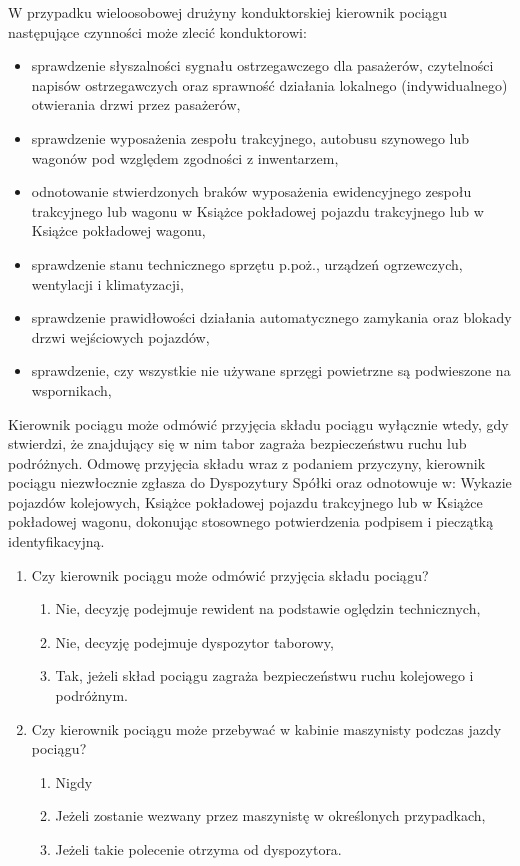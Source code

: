 W przypadku wieloosobowej drużyny konduktorskiej kierownik pociągu następujące czynności może zlecić konduktorowi:
\begin{itemize}
	\item sprawdzenie słyszalności sygnału ostrzegawczego dla pasażerów, czytelności napisów ostrzegawczych oraz sprawność działania lokalnego
	(indywidualnego) otwierania drzwi przez pasażerów,
	\item sprawdzenie wyposażenia zespołu trakcyjnego, autobusu szynowego lub wagonów pod względem zgodności z inwentarzem,
	\item odnotowanie stwierdzonych braków wyposażenia ewidencyjnego zespołu trakcyjnego lub wagonu w Książce pokładowej pojazdu trakcyjnego lub w
	Książce pokładowej wagonu,
	\item sprawdzenie stanu technicznego sprzętu p.poż., urządzeń ogrzewczych, wentylacji i klimatyzacji,
	\item sprawdzenie prawidłowości działania automatycznego zamykania oraz blokady drzwi wejściowych pojazdów,
	\item sprawdzenie, czy wszystkie nie używane sprzęgi powietrzne są podwieszone na wspornikach,
\end{itemize}

Kierownik pociągu może odmówić przyjęcia składu pociągu wyłącznie wtedy, gdy stwierdzi, że znajdujący się w nim tabor zagraża bezpieczeństwu ruchu lub podróżnych. Odmowę przyjęcia składu wraz z podaniem przyczyny, kierownik pociągu niezwłocznie zgłasza do Dyspozytury Spółki oraz odnotowuje w:
Wykazie pojazdów kolejowych, Książce pokładowej pojazdu trakcyjnego lub w Książce pokładowej wagonu, dokonując stosownego potwierdzenia podpisem
i pieczątką identyfikacyjną.

\begin{tcolorbox}
	\begin{enumerate}
		\item Czy kierownik pociągu może odmówić przyjęcia składu pociągu?
		\begin{enumerate}
			\item Nie, decyzję podejmuje rewident na podstawie oględzin technicznych,
			\item Nie, decyzję podejmuje dyspozytor taborowy,
			\item Tak, jeżeli skład pociągu zagraża bezpieczeństwu ruchu kolejowego i podróżnym.
		\end{enumerate}
		\item Czy kierownik pociągu może przebywać w kabinie maszynisty podczas jazdy pociągu?
		\begin{enumerate}
			\item Nigdy
			\item Jeżeli zostanie wezwany przez maszynistę w określonych przypadkach,
			\item Jeżeli takie polecenie otrzyma od dyspozytora.
		\end{enumerate}
	\end{enumerate}
\end{tcolorbox}

